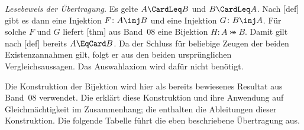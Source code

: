 \documentclass[main.tex]{subfiles}
\begin{document}
\begin{tabproofsplit}

\closeproofpart

  \setcounter{proofstepnr}{6}%

\closeproofpart

  \setcounter{proofstepnr}{7}%

\closeproofpart

  \setcounter{proofstepnr}{10}%

\closeproofpart
\end{tabproofsplit}

\noindent\emph{Lesebeweis der Übertragung.}
Es gelte \(A\CardLeq B\) und \(B\CardLeq A\). Nach
[def] gibt es dann eine Injektion
\(F\colon A\inj B\) und eine Injektion \(G\colon B\inj A\).
Für solche \(F\) und \(G\) liefert
[thm] aus Band~08
eine Bijektion \(H\colon A\bij B\). Damit gilt nach
[def] bereits \(A\EqCard B\).
Da der Schluss für beliebige Zeugen der beiden Existenzannahmen gilt,
folgt er aus den beiden ursprünglichen Vergleichsaussagen.
Das Auswahlaxiom wird dafür nicht benötigt.

Die Konstruktion der Bijektion wird hier als bereits bewiesenes Resultat
aus Band~08 verwendet. Die \CSBReadingLink{} erklärt diese Konstruktion
und ihre Anwendung auf Gleichmächtigkeit im Zusammenhang; die
\CSBProofsLink{} enthalten die Ableitungen dieser Konstruktion. Die folgende
Tabelle führt die eben beschriebene Übertragung aus.
\end{document}
